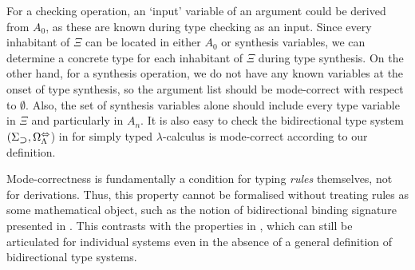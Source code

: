 For a checking operation, an `input' variable of an argument could be derived from $A_0$, as these are known during type checking as an input.
Since every inhabitant of $\Xi$ can be located in either $A_0$ or synthesis variables, we can determine a concrete type for each inhabitant of $\Xi$ during type synthesis.
On the other hand, for a synthesis operation, we do not have any known variables at the onset of type synthesis, so the argument list should be mode-correct with respect to $\emptyset$.
Also, the set of synthesis variables alone should include every type variable in $\Xi$ and particularly in $A_n$.
It is also easy to check the bidirectional type system $(\Sigma_{\mathbin{\bm{\supset}}}, \Omega^{\Leftrightarrow}_{\Lambda}$) in  for simply typed $\lambda$-calculus is mode-correct according to our definition.

\begin{remark}
  Mode-correctness is fundamentally a condition for typing \emph{rules} themselves, not for derivations.
  Thus, this property cannot be formalised without treating rules as some mathematical object, such as the notion of bidirectional binding signature presented in .
  This contrasts with the properties in , which can still be articulated for individual systems even in the absence of a general definition of bidirectional type systems.
\end{remark}

